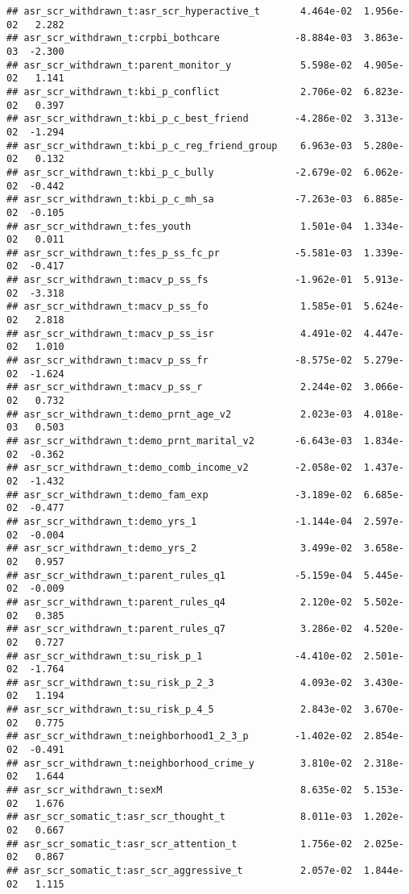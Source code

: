 \documentclass[
]{article}
\begin{document}
\begin{verbatim}
## asr_scr_withdrawn_t:asr_scr_hyperactive_t       4.464e-02  1.956e-02   2.282
## asr_scr_withdrawn_t:crpbi_bothcare             -8.884e-03  3.863e-03  -2.300
## asr_scr_withdrawn_t:parent_monitor_y            5.598e-02  4.905e-02   1.141
## asr_scr_withdrawn_t:kbi_p_conflict              2.706e-02  6.823e-02   0.397
## asr_scr_withdrawn_t:kbi_p_c_best_friend        -4.286e-02  3.313e-02  -1.294
## asr_scr_withdrawn_t:kbi_p_c_reg_friend_group    6.963e-03  5.280e-02   0.132
## asr_scr_withdrawn_t:kbi_p_c_bully              -2.679e-02  6.062e-02  -0.442
## asr_scr_withdrawn_t:kbi_p_c_mh_sa              -7.263e-03  6.885e-02  -0.105
## asr_scr_withdrawn_t:fes_youth                   1.501e-04  1.334e-02   0.011
## asr_scr_withdrawn_t:fes_p_ss_fc_pr             -5.581e-03  1.339e-02  -0.417
## asr_scr_withdrawn_t:macv_p_ss_fs               -1.962e-01  5.913e-02  -3.318
## asr_scr_withdrawn_t:macv_p_ss_fo                1.585e-01  5.624e-02   2.818
## asr_scr_withdrawn_t:macv_p_ss_isr               4.491e-02  4.447e-02   1.010
## asr_scr_withdrawn_t:macv_p_ss_fr               -8.575e-02  5.279e-02  -1.624
## asr_scr_withdrawn_t:macv_p_ss_r                 2.244e-02  3.066e-02   0.732
## asr_scr_withdrawn_t:demo_prnt_age_v2            2.023e-03  4.018e-03   0.503
## asr_scr_withdrawn_t:demo_prnt_marital_v2       -6.643e-03  1.834e-02  -0.362
## asr_scr_withdrawn_t:demo_comb_income_v2        -2.058e-02  1.437e-02  -1.432
## asr_scr_withdrawn_t:demo_fam_exp               -3.189e-02  6.685e-02  -0.477
## asr_scr_withdrawn_t:demo_yrs_1                 -1.144e-04  2.597e-02  -0.004
## asr_scr_withdrawn_t:demo_yrs_2                  3.499e-02  3.658e-02   0.957
## asr_scr_withdrawn_t:parent_rules_q1            -5.159e-04  5.445e-02  -0.009
## asr_scr_withdrawn_t:parent_rules_q4             2.120e-02  5.502e-02   0.385
## asr_scr_withdrawn_t:parent_rules_q7             3.286e-02  4.520e-02   0.727
## asr_scr_withdrawn_t:su_risk_p_1                -4.410e-02  2.501e-02  -1.764
## asr_scr_withdrawn_t:su_risk_p_2_3               4.093e-02  3.430e-02   1.194
## asr_scr_withdrawn_t:su_risk_p_4_5               2.843e-02  3.670e-02   0.775
## asr_scr_withdrawn_t:neighborhood1_2_3_p        -1.402e-02  2.854e-02  -0.491
## asr_scr_withdrawn_t:neighborhood_crime_y        3.810e-02  2.318e-02   1.644
## asr_scr_withdrawn_t:sexM                        8.635e-02  5.153e-02   1.676
## asr_scr_somatic_t:asr_scr_thought_t             8.011e-03  1.202e-02   0.667
## asr_scr_somatic_t:asr_scr_attention_t           1.756e-02  2.025e-02   0.867
## asr_scr_somatic_t:asr_scr_aggressive_t          2.057e-02  1.844e-02   1.115

\end{verbatim}
\end{document}
